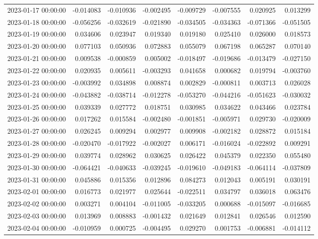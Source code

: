 \begin{tabular}{lrrrrrrr}
2023-01-17 00:00:00 & -0.014083 & -0.010936 & -0.002495 & -0.009729 & -0.007555 & 0.020925 & 0.013299 \\
2023-01-18 00:00:00 & -0.056256 & -0.032619 & -0.021890 & -0.034505 & -0.034363 & -0.071366 & -0.051505 \\
2023-01-19 00:00:00 & 0.034606 & 0.023947 & 0.019340 & 0.019180 & 0.025410 & 0.026000 & 0.018573 \\
2023-01-20 00:00:00 & 0.077103 & 0.050936 & 0.072883 & 0.055079 & 0.067198 & 0.065287 & 0.070140 \\
2023-01-21 00:00:00 & 0.009538 & -0.000859 & 0.005002 & -0.018497 & -0.019686 & -0.013479 & -0.027150 \\
2023-01-22 00:00:00 & 0.020935 & 0.005611 & -0.003293 & 0.041658 & 0.000682 & 0.019794 & -0.003760 \\
2023-01-23 00:00:00 & -0.003992 & 0.034898 & 0.008874 & 0.002829 & -0.000811 & 0.003713 & 0.026028 \\
2023-01-24 00:00:00 & -0.043882 & -0.038714 & -0.012278 & -0.053270 & -0.044216 & -0.051623 & -0.030032 \\
2023-01-25 00:00:00 & 0.039339 & 0.027772 & 0.018751 & 0.030985 & 0.034622 & 0.043466 & 0.023784 \\
2023-01-26 00:00:00 & 0.017262 & 0.015584 & -0.002480 & -0.001851 & -0.005971 & 0.029730 & -0.020009 \\
2023-01-27 00:00:00 & 0.026245 & 0.009294 & 0.002977 & 0.009908 & -0.002182 & 0.028872 & 0.015184 \\
2023-01-28 00:00:00 & -0.020470 & -0.017922 & -0.002027 & 0.006171 & -0.016024 & -0.022892 & 0.009291 \\
2023-01-29 00:00:00 & 0.039774 & 0.028962 & 0.030625 & 0.026422 & 0.045379 & 0.022350 & 0.055480 \\
2023-01-30 00:00:00 & -0.064421 & -0.040633 & -0.039245 & -0.019610 & -0.049183 & -0.064114 & -0.037809 \\
2023-01-31 00:00:00 & 0.045886 & 0.015356 & 0.012896 & 0.084273 & 0.012043 & 0.005191 & 0.030191 \\
2023-02-01 00:00:00 & 0.016773 & 0.021977 & 0.025644 & -0.022511 & 0.034797 & 0.036018 & 0.063476 \\
2023-02-02 00:00:00 & 0.003271 & 0.004104 & -0.011005 & -0.033205 & 0.000688 & -0.015097 & -0.016685 \\
2023-02-03 00:00:00 & 0.013969 & 0.008883 & -0.001432 & 0.021649 & 0.012841 & 0.026546 & 0.012590 \\
2023-02-04 00:00:00 & -0.010959 & 0.000725 & -0.004495 & 0.029270 & 0.001753 & -0.006881 & -0.014112 \\

\end{tabular}
